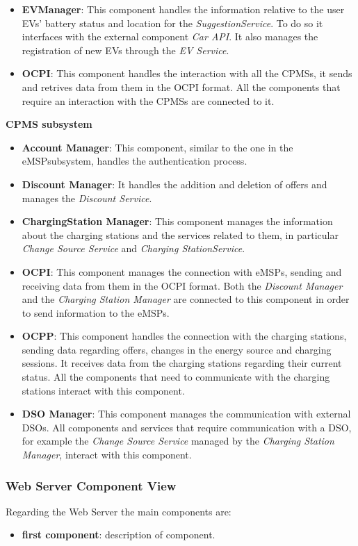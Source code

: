 \documentclass[table, 12pt]{article}
\begin{document}
\begin{itemize}
    \item \textbf{EVManager}: This component handles the information relative to the user EVs' battery status and location for the \textit{SuggestionService}. To do so it interfaces with the external component \textit{Car API}. It also manages the registration of new EVs through the \textit{EV Service}.
    \item \textbf{OCPI}: This component handles the interaction with all the CPMSs, it sends and retrives data from them in the OCPI format. All the components that require an interaction with the CPMSs are connected to it.
\end{itemize}
\textbf{CPMS subsystem}
\begin{itemize}
    \item \textbf{Account Manager}: This component, similar to the one in the eMSPsubsystem, handles the authentication process. 
    \item \textbf{Discount Manager}: It handles the addition and deletion of offers and manages the \textit{Discount Service}.
    \item \textbf{ChargingStation Manager}: This component manages the information about the charging stations and the services related to them, in particular \textit{Change Source Service} and \textit{Charging StationService}.
    \item \textbf{OCPI}: This component manages the connection with eMSPs, sending and receiving data from them in the OCPI format. Both the \textit{Discount Manager} and the \textit{Charging Station Manager} are connected to this component in order to send information to the eMSPs.
    \item \textbf{OCPP}: This component handles the connection with the charging stations, sending data regarding offers, changes in the energy source and charging sessions. It receives data from the charging stations regarding their current status. All the components that need to communicate with the charging stations interact with this component.
    \item \textbf{DSO Manager}: This component manages the communication with external DSOs. All components and services that require communication with a DSO, for example the \textit{Change Source Service} managed by the \textit{Charging Station Manager}, interact with this component.
\end{itemize}
\subsubsection*{Web Server Component View}
Regarding the Web Server the main components are:
\begin{itemize}
    \item \textbf{first component}: description of component.
\end{itemize}
\end{document}
